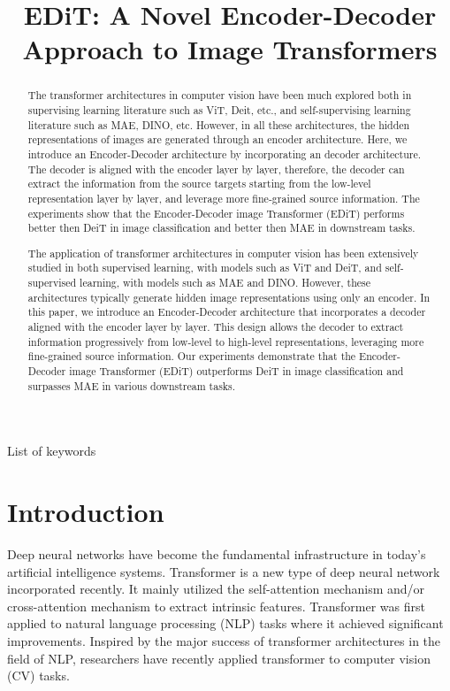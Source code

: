 \documentclass[anon,12pt]{colt2024} %
\title[Short Title]{
  EDiT: A Novel Encoder-Decoder Approach to Image Transformers
  }
\begin{document}
\maketitle

\begin{abstract}%
  The transformer architectures in computer vision have been much explored both in supervising learning literature such as ViT, Deit, etc., and self-supervising learning literature such as MAE, DINO, etc.
  However, in all these architectures, the hidden representations of images are generated through an encoder architecture.
  Here, we introduce an Encoder-Decoder architecture by incorporating an decoder architecture.
  The decoder is aligned with the encoder layer by layer, therefore, the decoder can extract the information from the source targets starting from the low-level representation layer by layer, and leverage more fine-grained source information.
  The experiments show that the Encoder-Decoder image Transformer (EDiT) performs better then DeiT in image classification and better then MAE in downstream tasks.
  
  The application of transformer architectures in computer vision has been extensively studied in both supervised learning, with models such as ViT and DeiT, and self-supervised learning, with models such as MAE and DINO. However, these architectures typically generate hidden image representations using only an encoder. In this paper, we introduce an Encoder-Decoder architecture that incorporates a decoder aligned with the encoder layer by layer. This design allows the decoder to extract information progressively from low-level to high-level representations, leveraging more fine-grained source information. Our experiments demonstrate that the Encoder-Decoder image Transformer (EDiT) outperforms DeiT in image classification and surpasses MAE in various downstream tasks.
  
\end{abstract}

\begin{keywords}%
  List of keywords%
\end{keywords}

\section{Introduction}

Deep neural networks have become the fundamental infrastructure in today's artificial intelligence systems. 
Transformer is a new type of deep neural network incorporated recently.
It mainly utilized the self-attention mechanism and/or cross-attention mechanism to extract intrinsic features.
Transformer was first applied to natural language processing (NLP) tasks where it achieved significant improvements.
Inspired by the major success of transformer architectures in the field of NLP, researchers have recently applied transformer to computer vision (CV) tasks.
\end{document}
